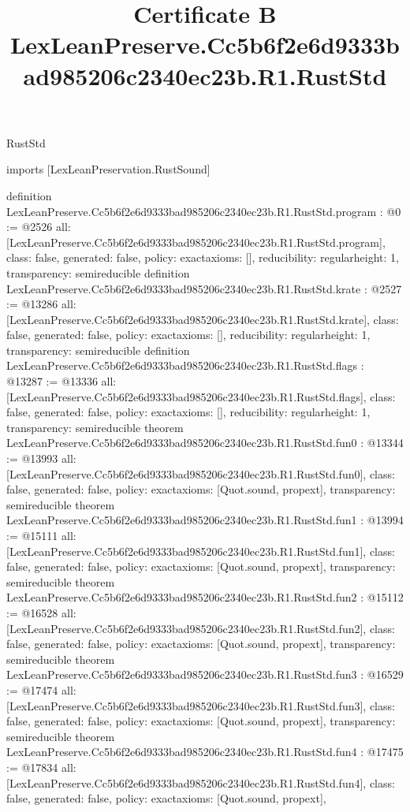 \begin{lexlean}{RustStd}
\title{Certificate B LexLeanPreserve.Cc5b6f2e6d9333bad985206c2340ec23b.R1.RustStd}
\begin{coremodule}
imports [LexLeanPreservation.RustSound]

definition LexLeanPreserve.Cc5b6f2e6d9333bad985206c2340ec23b.R1.RustStd.program : @0 := @2526 {
  all: [LexLeanPreserve.Cc5b6f2e6d9333bad985206c2340ec23b.R1.RustStd.program],
  class: false,
  generated: false,
  policy: exact{axioms: []},
  reducibility: regular{height: 1},
  transparency: semireducible
}
definition LexLeanPreserve.Cc5b6f2e6d9333bad985206c2340ec23b.R1.RustStd.krate : @2527 := @13286 {
  all: [LexLeanPreserve.Cc5b6f2e6d9333bad985206c2340ec23b.R1.RustStd.krate],
  class: false,
  generated: false,
  policy: exact{axioms: []},
  reducibility: regular{height: 1},
  transparency: semireducible
}
definition LexLeanPreserve.Cc5b6f2e6d9333bad985206c2340ec23b.R1.RustStd.flags : @13287 := @13336 {
  all: [LexLeanPreserve.Cc5b6f2e6d9333bad985206c2340ec23b.R1.RustStd.flags],
  class: false,
  generated: false,
  policy: exact{axioms: []},
  reducibility: regular{height: 1},
  transparency: semireducible
}
theorem LexLeanPreserve.Cc5b6f2e6d9333bad985206c2340ec23b.R1.RustStd.fun0 : @13344 := @13993 {
  all: [LexLeanPreserve.Cc5b6f2e6d9333bad985206c2340ec23b.R1.RustStd.fun0],
  class: false,
  generated: false,
  policy: exact{axioms: [Quot.sound, propext]},
  transparency: semireducible
}
theorem LexLeanPreserve.Cc5b6f2e6d9333bad985206c2340ec23b.R1.RustStd.fun1 : @13994 := @15111 {
  all: [LexLeanPreserve.Cc5b6f2e6d9333bad985206c2340ec23b.R1.RustStd.fun1],
  class: false,
  generated: false,
  policy: exact{axioms: [Quot.sound, propext]},
  transparency: semireducible
}
theorem LexLeanPreserve.Cc5b6f2e6d9333bad985206c2340ec23b.R1.RustStd.fun2 : @15112 := @16528 {
  all: [LexLeanPreserve.Cc5b6f2e6d9333bad985206c2340ec23b.R1.RustStd.fun2],
  class: false,
  generated: false,
  policy: exact{axioms: [Quot.sound, propext]},
  transparency: semireducible
}
theorem LexLeanPreserve.Cc5b6f2e6d9333bad985206c2340ec23b.R1.RustStd.fun3 : @16529 := @17474 {
  all: [LexLeanPreserve.Cc5b6f2e6d9333bad985206c2340ec23b.R1.RustStd.fun3],
  class: false,
  generated: false,
  policy: exact{axioms: [Quot.sound, propext]},
  transparency: semireducible
}
theorem LexLeanPreserve.Cc5b6f2e6d9333bad985206c2340ec23b.R1.RustStd.fun4 : @17475 := @17834 {
  all: [LexLeanPreserve.Cc5b6f2e6d9333bad985206c2340ec23b.R1.RustStd.fun4],
  class: false,
  generated: false,
  policy: exact{axioms: [Quot.sound, propext]},
}
\end{coremodule}
\end{lexlean}
